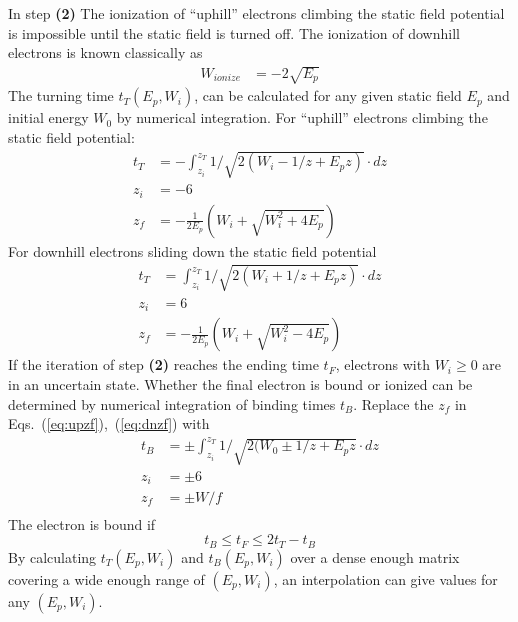 \documentclass[aps,pra,preprint,groupedaddress]{revtex4-1}
\begin{document}
In step \textbf{(2)} The ionization of ``uphill'' electrons climbing the static field potential is impossible until the static field is turned off. The ionization of downhill electrons is known classically as
\begin{align}
W_{ionize} & = -2 \sqrt{E_p}
\end{align}
The turning time $t_T (E_p, W_i)$,  can be calculated for any given static field $E_p$ and initial energy $W_0$ by numerical integration. For ``uphill'' electrons climbing the static field potential:
\begin{align}
t_{T} & = -\int_{z_i}^{z_T} 1/\sqrt{2(W_i - 1/z + E_p z)} \cdot dz \label{eq:uptt} \\
z_i & = -6 \label{eq:upzi} \\
z_f & = -\frac{1}{2E_p} (W_i + \sqrt{W_i^2 + 4E_p}) \label{eq:upzf}
\end{align}
For downhill electrons sliding down the static field potential
\begin{align}
t_{T} & = \int_{z_i}^{z_T} 1/\sqrt{2(W_i + 1/z + E_p z)} \cdot dz \label{eq:dntt} \\
z_i & = 6 \label{eq:dnzi} \\
z_f & = -\frac{1}{2E_p} (W_i + \sqrt{W_i^2 - 4E_p}) \label{eq:dnzf}
\end{align}
If the iteration of step \textbf{(2)} reaches the ending time $t_F$, electrons with $W_i \geq 0$ are in an uncertain state. Whether the final electron is bound or ionized can be determined by numerical integration of binding times $t_B$. Replace the $z_f$ in Eqs.~(\ref{eq:upzf}),~(\ref{eq:dnzf}) with
\begin{align}
t_B & = \pm \int_{z_i}^{z_T} 1/\sqrt{2(W_0 \pm 1/z + E_p z} \cdot dz \\
z_i & = \pm 6 \\
z_f & = \pm W/f \\
\end{align}
The electron is bound if
\begin{equation}
t_B \leq t_F \leq 2 t_T - t_B
\end{equation}
By calculating $t_T(E_p, W_i)$ and $t_B(E_p, W_i)$ over a dense enough matrix covering a wide enough range of $(E_p, W_i)$, an interpolation can give values for any $(E_p, W_i)$.
\end{document}
